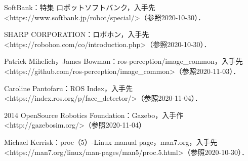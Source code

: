 \documentclass[11pt]{ujarticle} %
\begin{document}

\begin{thebibliography}{99}
  \begin{flushleft}
  SoftBank：特集 \textbar ロボット\textbar ソフトバンク，入手先\textless https://www.softbank.jp/robot/special/\textgreater（参照2020-10-30）．
  \end{flushleft}
  \begin{flushleft}
    SHARP CORPORATION：ロボホン，入手先\textless https://robohon.com/co/introduction.php\textgreater（参照2020-10-30）．
    \end{flushleft}
  \begin{flushleft}
    Patrick Mihelich，James Bowman：ros-perception/image\_common，入手先\textless https://github.com/ros-perception/image\_common\textgreater（参照2020-11-03）．
  \end{flushleft}
  \begin{flushleft}
    Caroline Pantofaru：ROS Index，入手先\textless https://index.ros.org/p/face\_detector/\textgreater（参照2020-11-04）．
  \end{flushleft}
  \begin{flushleft}
  2014 OpenSource Robotics Foundation：Gazebo，入手作\textless http://gazebosim.org/\textgreater（参照2020-11-04）
  \end{flushleft}
  \begin{flushleft}
  Michael Kerrisk：proc（5）-Linux manual page，man7.org，入手先\textless https://man7.org/linux/man-pages/man5/proc.5.html\textgreater（参照2020-10-30）．
  \end{flushleft}

\end{thebibliography}
\end{document}
